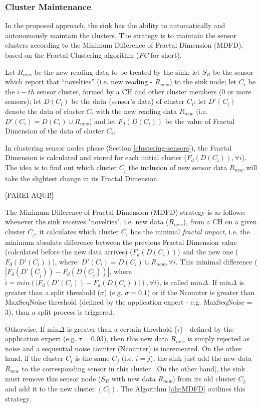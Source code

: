 \documentclass{acm_proc_article-sp}
\begin{document}
\subsubsection{Cluster Maintenance}
\label{cluster-maintenance}

In the proposed approach, the sink has the ability to automatically and
autonomously maintain the clusters. The strategy is to maintain the sensor
clusters according to the Minimum Difference of Fractal Dimension (MDFD), based
on the Fractal Clustering algorithm (\textit{FC} for short).

Let $R_{new}$ be the new reading data to be treated by the sink; let $S_{R}$ be
the sensor which report that ``novelties'' (i.e. new reading - $R_{new}$) to the
sink node; let $C_i$ be the $i-th$ sensor cluster, formed by a 
CH and other cluster members (0 or more sensors); let $D(C_i)$
be the data (sensor's data) of cluster $C_i$; let $D'(C_i)$ denote the data of
cluster $C_i$ with the new reading data $R_{new}$ (i.e. $D'(C_i) = D(C_i) \cup
R_{new}$) and let $F_{d}(D(C_i))$ be the value of Fractal Dimension of the data
of cluster $C_i$.

In clustering sensor nodes phase (Section \ref{clustering-sensors}), the Fractal
Dimension is calculated and stored for each initial cluster ($F_{d}(D(C_i)),
\forall i$). The idea is to find out which cluster $C_{\hat{i}}$ the inclusion
of new sensor data $R_{new}$ will take the slightest change in its Fractal
Dimension.

[PAREI AQUI!]

The Minimum Difference of Fractal Dimension (MDFD) strategy is as follows:
whenever the sink receives "novelties", i.e. new data ($R_{new}$), from a CH on
a given cluster $C_j$, it calculates which cluster $C_i$ has the minimal
\textit{fractal impact}, i.e. the minimum absolute difference between the
previous Fractal Dimension value (calculated before the new data arrives)
($F_d(D(C_i))$) and the new one ($F_d(D'(C_i))$), where: $D'(C_i) = D(C_i) \cup
R_{new}, \forall i$.
This minimal difference ($|F_d(D'(C_{\hat{i}})) - F_d(D(C_{\hat{i}}))|$,
where $\hat{i} = min(|F_d(D'(C_i)) - F_d(D(C_i))|), \forall i$), is called
min$\Delta$. If min$\Delta$ is greater than a split threshold ($\sigma$) (e.g.
$\sigma = 0.1$) or if the Ncounter is greater than MaxSeqNoise threshold
(defined by the application expert - e.g. MaxSeqNoise = 3), than a split process
is triggered.

Otherwise,  If min$\Delta$ is greater than a certain threshold ($\tau$) -
defined by the application expert (e.g. $\tau = 0.03$), then this new data
$R_{new}$ is simply rejected as noise and a sequential noise counter (Ncounter)
is incremented. On the other hand, if the cluster $C_i$ is the same $C_j$ (i.e.
$i=j$), the sink just add the new data $R_{new}$ to the corresponding sensor in
this cluster.
[On the other hand], the sink must remove this sensor node ($S_{R}$ with new
data $R_{new}$) from its old cluster $C_j$ and add it to the new cluster $(C_i)$.
The Algorithm \ref{alg:MDFD} outlines this strategy.
\end{document}
